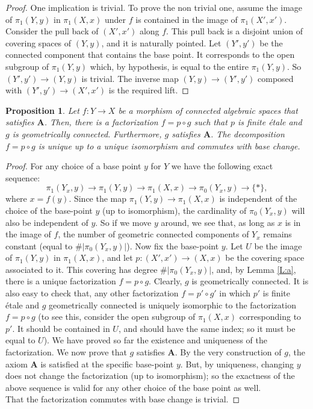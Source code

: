 \documentclass{amsart}
\newtheorem{prop}[thm]{Proposition}
\theoremstyle{definition}
\theoremstyle{remark}
\theoremstyle{remark}
\newcommand{\ppXX}{\pi_1(X,x)}
\newcommand{\ppYY}{\pi_1(Y,y)}
\newcommand{\pXX}{\pi_1(X',x')}
\let\:=\colon
\begin{document}
\begin{proof}
One implication is trivial.  To prove the non trivial one, assume
the image of $\ppYY$ in $\ppXX$ under $f$ is contained in the
image of $\pXX$. Consider the pull back of $(X',x')$ along $f$.
This pull back is a disjoint union of covering spaces of $(Y,y)$,
and it is naturally pointed. Let $(Y',y')$ be the connected
component  that contains the base point. It corresponds to the
open subgroup of $\ppYY$ which, by hypothesis, is equal to the
entire $\ppYY$. So $(Y',y') \to (Y,y)$ is trivial. The inverse map
$(Y,y) \to (Y',y')$ composed with $(Y',y') \to (X',x')$ is the
required lift.
\end{proof}

\begin{prop}{\label{P:decomp}}
Let  $f \: Y \to X$ be a morphism of connected algebraic spaces
that satisfies $\mathbf{A}$. Then, there is a factorization $f =p
\circ g$ such that $p$ is finite \'{e}tale and $g$ is
geometrically connected. Furthermore, $g$ satisfies $\mathbf{A}$.
The decomposition $f =p \circ g$ is unique up to a unique
isomorphism and commutes with base change.
\end{prop}

\begin{proof}
For any choice of a base point $y$ for $Y$ we have the following
exact sequence: $$\pi_1(Y_x,y) \to \ppYY \to \ppXX \to
\pi_0(Y_x,y) \to \{*\},$$ where $x=f(y)$. Since the map $\ppYY \to
\ppXX$ is independent of the choice of the base-point $y$ (up to
isomorphism), the cardinality of $\pi_0(Y_x,y)$ will also be
independent of $y$. So if we move $y$ around, we see that, as long
as $x$ is in the image of $f$, the number of geometric connected
components of $Y_x$ remains constant (equal to
$\#|\pi_0(Y_x,y)|$). Now fix the base-point $y$. Let $U$ be the
image of $\ppYY$ in $\ppXX$, and let $p \: (X',x') \to (X,x)$ be
the covering space associated to it. This covering has degree
$\#|\pi_0(Y_x,y)|$, and, by Lemma \ref{L:a}, there is a unique
factorization $f =p \circ g$. Clearly, $g$ is geometrically
connected. It is also easy to check that, any other factorization
$f =p' \circ g'$ in which $p'$ is finite \'{e}tale and $g$
geometrically connected is uniquely isomorphic to the
factorization $f =p \circ g$ (to see this, consider the open
subgroup of $\ppXX$ corresponding to $p'$. It should be contained
in $U$, and should have the same index; so it must be equal to
$U$). We have proved so far the existence and uniqueness of the
factorization. We now prove that $g$ satisfies $\mathbf{A}$. By
the very construction of $g$, the axiom $\mathbf{A}$ is satisfied
at the specific base-point $y$. But, by uniqueness, changing $y$
does not change the factorization (up to isomorphism); so the
exactness of the above sequence is valid for any other choice of
the base point as well. \\ That the factorization commutes with
base change is trivial.
\end{proof}
\end{document}
